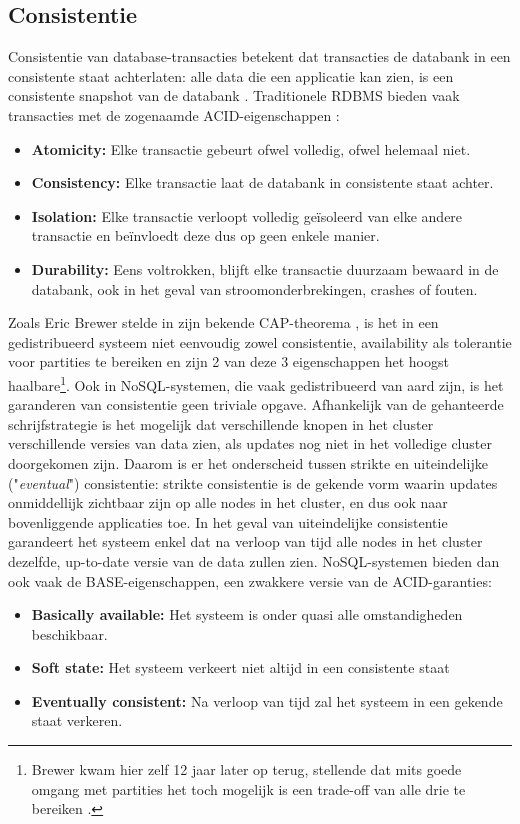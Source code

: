 \subsection{Consistentie}
\label{consistentie}

Consistentie van database-transacties betekent dat transacties de databank in een consistente staat achterlaten: alle data die een applicatie kan zien, is een consistente snapshot van de databank \cite{ports2010transactional}. Traditionele RDBMS bieden vaak transacties met de zogenaamde ACID-eigenschappen \cite{haerder1983principles}:
\begin{itemize}
\item \textbf{Atomicity:} Elke transactie gebeurt ofwel volledig, ofwel helemaal niet.
\item \textbf{Consistency:} Elke transactie laat de databank in consistente staat achter.
\item \textbf{Isolation:} Elke transactie verloopt volledig ge\"isoleerd van elke andere transactie en be\"invloedt deze dus op geen enkele manier.
\item \textbf{Durability:} Eens voltrokken, blijft elke transactie duurzaam bewaard in de databank, ook in het geval van stroomonderbrekingen, crashes of fouten.
\end{itemize}

Zoals Eric Brewer stelde in zijn bekende CAP-theorema \cite{brewer2000towards}, is het in een gedistribueerd systeem niet eenvoudig zowel consistentie, availability als tolerantie voor partities te bereiken en zijn 2 van deze 3 eigenschappen het hoogst haalbare\footnote{Brewer kwam hier zelf 12 jaar later op terug, stellende dat mits goede omgang met partities het toch mogelijk is een trade-off van alle drie te bereiken \cite{brewer2012cap}.}.
Ook in NoSQL-systemen, die vaak gedistribueerd van aard zijn, is het garanderen van consistentie geen triviale opgave. Afhankelijk van de gehanteerde schrijfstrategie is het mogelijk dat verschillende knopen in het cluster verschillende versies van data zien, als updates nog niet in het volledige cluster doorgekomen zijn. Daarom is er het onderscheid tussen strikte en uiteindelijke ("\textit{eventual}") consistentie: strikte consistentie is de gekende vorm waarin updates onmiddellijk zichtbaar zijn op alle nodes in het cluster, en dus ook naar bovenliggende applicaties toe. In het geval van uiteindelijke consistentie garandeert het systeem enkel dat na verloop van tijd alle nodes in het cluster dezelfde, up-to-date versie van de data zullen zien. NoSQL-systemen bieden dan ook vaak de BASE-eigenschappen, een zwakkere versie van de ACID-garanties:
\begin{itemize}
\item \textbf{Basically available:} Het systeem is onder quasi alle omstandigheden beschikbaar.
\item \textbf{Soft state:} Het systeem verkeert niet altijd in een consistente staat
\item \textbf{Eventually consistent:} Na verloop van tijd zal het systeem in een gekende staat verkeren.
\end{itemize}

